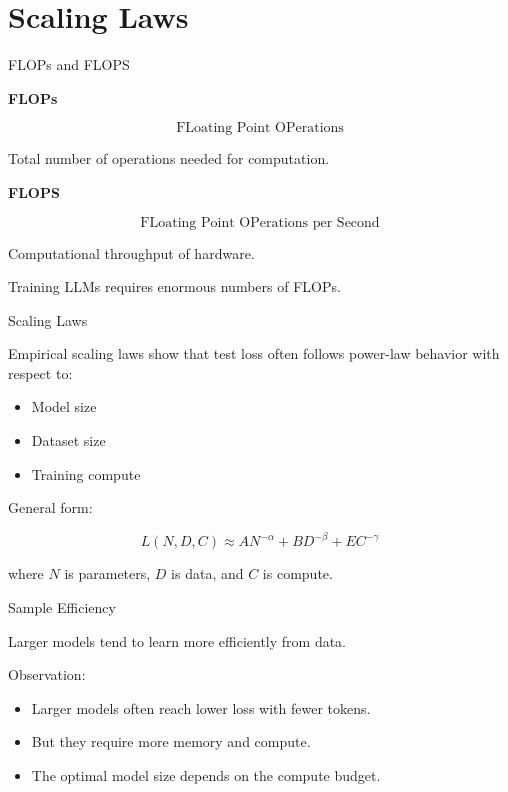 \documentclass[aspectratio=169]{beamer}
\begin{document}
\section{Scaling Laws}

\begin{frame}{FLOPs and FLOPS}

\textbf{FLOPs}

\[
\text{FLoating Point OPerations}
\]

Total number of operations needed for computation.

\vspace{0.5cm}

\textbf{FLOPS}

\[
\text{FLoating Point OPerations per Second}
\]

Computational throughput of hardware.

\vspace{0.5cm}

Training LLMs requires enormous numbers of FLOPs.

\end{frame}

\begin{frame}{Scaling Laws}

Empirical scaling laws show that test loss often follows power-law behavior with respect to:

\begin{itemize}
    \item Model size
    \item Dataset size
    \item Training compute
\end{itemize}

\vspace{0.5cm}

General form:

\[
L(N,D,C)
\approx
A N^{-\alpha}
+
B D^{-\beta}
+
E C^{-\gamma}
\]

\vspace{0.3cm}

where $N$ is parameters, $D$ is data, and $C$ is compute.

\end{frame}

\begin{frame}{Sample Efficiency}

Larger models tend to learn more efficiently from data.

\vspace{0.5cm}

Observation:

\begin{itemize}
    \item Larger models often reach lower loss with fewer tokens.
    \item But they require more memory and compute.
    \item The optimal model size depends on the compute budget.
\end{itemize}

\end{frame}
\end{document}
